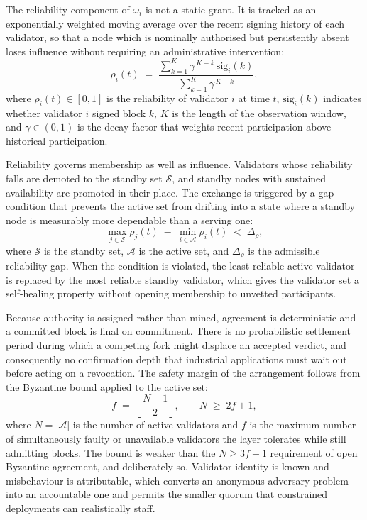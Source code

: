 The reliability component of $\omega_i$ is not a static grant. It is tracked as an exponentially weighted moving average over the recent signing history of each validator, so that a node which is nominally authorised but persistently absent loses influence without requiring an administrative intervention:
\begin{equation}
\label{eq:poa2-reliability}
\rho_i(t) \;=\; \frac{\sum_{k=1}^{K} \gamma^{\,K-k} \, \mathrm{sig}_i(k)}{\sum_{k=1}^{K} \gamma^{\,K-k}} ,
\end{equation}
where $\rho_i(t) \in [0,1]$ is the reliability of validator $i$ at time $t$, $\mathrm{sig}_i(k)$ indicates whether validator $i$ signed block $k$, $K$ is the length of the observation window, and $\gamma \in (0,1)$ is the decay factor that weights recent participation above historical participation.

Reliability governs membership as well as influence. Validators whose reliability falls are demoted to the standby set $\mathcal{S}$, and standby nodes with sustained availability are promoted in their place. The exchange is triggered by a gap condition that prevents the active set from drifting into a state where a standby node is measurably more dependable than a serving one:
\begin{equation}
\label{eq:poa2-gap}
\max_{j \in \mathcal{S}} \rho_j(t) \;-\; \min_{i \in \mathcal{A}} \rho_i(t) \;<\; \Delta_\rho ,
\end{equation}
where $\mathcal{S}$ is the standby set, $\mathcal{A}$ is the active set, and $\Delta_\rho$ is the admissible reliability gap. When the condition is violated, the least reliable active validator is replaced by the most reliable standby validator, which gives the validator set a self-healing property without opening membership to unvetted participants.

Because authority is assigned rather than mined, agreement is deterministic and a committed block is final on commitment. There is no probabilistic settlement period during which a competing fork might displace an accepted verdict, and consequently no confirmation depth that industrial applications must wait out before acting on a revocation. The safety margin of the arrangement follows from the Byzantine bound applied to the active set:
\begin{equation}
\label{eq:poa2-fault}
f \;=\; \left\lfloor \frac{N-1}{2} \right\rfloor , \qquad N \;\geq\; 2f + 1 ,
\end{equation}
where $N = |\mathcal{A}|$ is the number of active validators and $f$ is the maximum number of simultaneously faulty or unavailable validators the layer tolerates while still admitting blocks. The bound is weaker than the $N \geq 3f+1$ requirement of open Byzantine agreement, and deliberately so. Validator identity is known and misbehaviour is attributable, which converts an anonymous adversary problem into an accountable one and permits the smaller quorum that constrained deployments can realistically staff.

